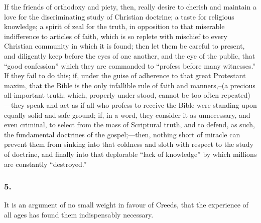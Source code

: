 \documentclass[
]{book}
\begin{document}
If the friends of orthodoxy and piety, then, really desire to cherish and maintain a love for the discriminating study of Christian doctrine; a taste for religious knowledge; a spirit of zeal for the truth, in opposition to that miserable indifference to articles of faith, which is so replete with mischief to every Christian community in which it is found; then let them be careful to present, and diligently keep before the eyes of one another, and the eye of the public, that ``good confession'' which they are commanded to ``profess before many witnesses.'' If they fail to do this; if, under the guise of adherence to that great Protestant maxim, that the Bible is the only infallible rule of faith and manners,--(a precious all-important truth; which, properly under stood, cannot be too often repeated)---they speak and act as if all who profess to receive the Bible were standing upon equally solid and safe ground; if, in a word, they consider it as unnecessary, and even criminal, to select from the mass of Scriptural truth, and to defend, as such, the fundamental doctrines of the gospel;---then, nothing short of miracle can prevent them from sinking into that coldness and sloth with respect to the study of doctrine, and finally into that deplorable ``lack of knowledge'' by which millions are constantly ``destroyed.''

\hypertarget{section-4}{%
\subsubsection*{5.}\label{section-4}}

It is an argument of no small weight in favour of Creeds, that the experience of all ages has found them indispensably necessary.
\end{document}
